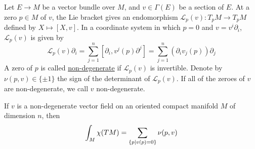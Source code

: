Let $E\to M$ be a vector bundle over  $M$, and $v\in\Gamma(E)$ be a section of $E$.
At a zero $p\in M$ of  $v$, the Lie bracket gives an endomorphism 
$\mathcal{L}_p(v) : T_pM \to T_pM$ defined by  $X\mapsto [X,v]$. In a coordinate system in
which  $p=0$ and  $v= v^i \partial_i$,  $\mathcal{L}_p(v)$ is given by 
 \[
	 \mathcal{L}_p(v)\partial_i = \sum_{j=1}^{n} [\partial_i, v^j(p)\partial^j] 
	 = \sum_{j=1}^{n} (\partial_i v_j(p)) \partial_j
\] 
A zero of $p$ is called \underline{non-degenerate} if  $\mathcal{L}_p(v)$ is
invertible. Denote by $\nu(p,v) \in \{\pm 1\}$ the sign of the determinant of
$\mathcal{L}_p(v)$. If all of the zeroes of $v$ are non-degenerate, we call  $v$
non-degenerate. 

\begin{thm} %
	If $v$ is a non-degenerate vector field on an oriented compact manifold $M$ 
	of dimension $n$, then 
	\[
		 \int_M \chi(TM) = \sum_{\set{p|v(p)=0}} \nu(p,v)	
	\] 
\end{thm}
